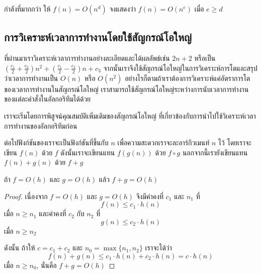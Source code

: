 \begin{quiz}{กำลัง{\wbr}ที่มา{\wbr}กก{\wbr}ว่า}
ให้ $f(n) = O(n^d)$ จง{\wbr}แสดง{\wbr}ว่า $f(n) = O(n^e)$ เมื่อ $e\geq d$
\end{quiz}

\subsection{การ{\wbr}วิเคราะห์{\wbr}เวลา{\wbr}การ{\wbr}ทำงาน{\wbr}โดย{\wbr}ใช้{\wbr}สัญกรณ์{\wbr}โอ{\wbr}ใหญ่}

ที่{\wbr}ผ่าน{\wbr}มา{\wbr}เรา{\wbr}วิเคราะห์{\wbr}เวลา{\wbr}การ{\wbr}ทำงาน{\wbr}อย่าง{\wbr}ละเอียด{\wbr}และ{\wbr}ได้{\wbr}ผลลัพธ์{\wbr}เช่น $2n+2$ หรือ{\wbr}เป็น{\wbr}
$\left(\frac{c_1}{2} + \frac{c_2}{2}\right)n^2 + \left(\frac{c_1}{2} -
\frac{c_2}{2}\right)n + c_3$
จากนั้น{\wbr}เรา{\wbr}จึง{\wbr}ใช้{\wbr}สัญกรณ์{\wbr}โอ{\wbr}ใหญ่{\wbr}ใน{\wbr}การ{\wbr}วิเคราะห์{\wbr}การ{\wbr}โต{\wbr}และ{\wbr}สรุป{\wbr}ว่า{\wbr}เวลา{\wbr}การ{\wbr}ทำงาน{\wbr}เป็น $O(n)$
หรือ $O(n^2)$
อย่างไรก็ตาม{\wbr}ถ้า{\wbr}เรา{\wbr}ต้องการ{\wbr}วิเคราะห์{\wbr}แค่{\wbr}อัตรา{\wbr}การ{\wbr}โต{\wbr}ของ{\wbr}เวลา{\wbr}การ{\wbr}ทำงาน{\wbr}ใน{\wbr}สัญกรณ์{\wbr}โอ{\wbr}ใหญ่{\wbr}
เรา{\wbr}สามารถ{\wbr}ใช้{\wbr}สัญกรณ์{\wbr}โอ{\wbr}ใหญ่{\wbr}ระหว่าง{\wbr}การ{\wbr}นับ{\wbr}เวลา{\wbr}การ{\wbr}ทำงาน{\wbr}ของ{\wbr}แต่ละ{\wbr}คำสั่ง{\wbr}ใน{\wbr}อัล{\wbr}กอ{\wbr}ริ{\wbr}ทึม{\wbr}ได้{\wbr}ด้วย{\wbr}

เรา{\wbr}จะ{\wbr}เริ่ม{\wbr}โดย{\wbr}การ{\wbr}พิสูจน์{\wbr}คุณสมบัติ{\wbr}เพิ่มเติม{\wbr}ของ{\wbr}สัญกรณ์{\wbr}โอ{\wbr}ใหญ่{\wbr}
ที่{\wbr}เกี่ยวข้อง{\wbr}กับ{\wbr}การ{\wbr}นำ{\wbr}ไป{\wbr}ใช้{\wbr}วิเคราะห์{\wbr}เวลา{\wbr}การ{\wbr}ทำงาน{\wbr}ของ{\wbr}อัล{\wbr}กอ{\wbr}ริ{\wbr}ทึม{\wbr}ก่อน{\wbr}

ต่อไป{\wbr}ฟังก์ชัน{\wbr}ของ{\wbr}เรา{\wbr}จะ{\wbr}เป็น{\wbr}ฟังก์ชัน{\wbr}ที่{\wbr}ขึ้น{\wbr}กับ $n$ เพื่อ{\wbr}ความ{\wbr}สะดวก{\wbr}เรา{\wbr}จะ{\wbr}ละ{\wbr}อาร์กิวเมนท์ $n$ ไว้{\wbr}
โดย{\wbr}เรา{\wbr}จะ{\wbr}เขียน $f(n)$ ด้วย $f$ ดังนั้น{\wbr}เรา{\wbr}จะ{\wbr}เขียน{\wbr}แทน $f(g(n))$ ด้วย $f\circ g$
นอกจากนี้{\wbr}เรา{\wbr}ยัง{\wbr}เขียน{\wbr}แทน $f(n)+g(n)$ ด้วย $f+g$

\begin{theorem}
ถ้า $f=O(h)$ และ $g=O(h)$ แล้ว $f+g = O(h)$
\end{theorem}
\begin{proof}
เนื่องจาก $f=O(h)$ และ $g=O(h)$ จึง{\wbr}มี{\wbr}ค่าคงที่ $c_1$ และ $n_1$ ที่{\wbr}
\[ f(n) \leq c_1\cdot h(n)\] 
เมื่อ $n\geq n_1$ และ{\wbr}ค่าคงที่ $c_2$ กับ $n_2$ ที่ 
\[ g(n) \leq c_2\cdot h(n) \] 
เมื่อ $n\geq n_2$

ดังนั้น ถ้า{\wbr}ให้ $c=c_1+c_2$ และ $n_0=\max\{n_1,n_2\}$ เรา{\wbr}จะ{\wbr}ได้{\wbr}ว่า{\wbr}
\[
f(n) + g(n) \leq c_1\cdot h(n) + c_2\cdot h(n) = c\cdot h(n)
\]
เมื่อ $n\geq n_0$, นั่น{\wbr}คือ $f+g=O(h)$
\end{proof}


